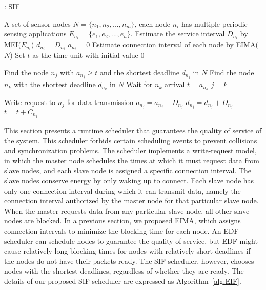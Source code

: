 \documentclass[10pt,journal,compsoc]{IEEEtran}
\newcommand{\algorithmicinput}{\textbf{Input:}}
\newcommand{\INPUT}{\item[\algorithmicinput]}
\begin{document}
\begin{algorithm}[h!]
  \caption{: SIF}
  \label{alg:EIF}
  \begin{algorithmic}[1]

  \INPUT
  A set of sensor nodes $N=\{n_1, n_2, ..., n_m\}$, each node $n_i$ has multiple periodic sensing applications $E_{n_i}=\{e_1, e_2,..., e_h\}$.
    \State Estimate the service interval $D_{n_i}$ by MEI($E_{n_i}$)
    \State $d_{n_i}=D_{n_i}$
    \State $a_{n_i}=0$
   \EndFor
   \State Estimate connection interval of each node by EIMA($N$)
   \State Set $t$ as the time unit with initial value $0$
  \EndIf

    \State Find the node $n_j$ with $a_{n_j} \geq t$ and the shortest deadline $d_{n_j}$ in $N$
    \State Find the node $n_k$ with the shortest deadline $d_{n_k}$  in $N$
        \State Wait for $n_k$ arrival
        \State $t=a_{n_k}$
        \State $j=k$
    \EndIf
   \EndIf

    \State Write request to $n_j$ for data transmission
    \State $a_{n_j}=a_{n_j}+D_{n_j}$
    \State $d_{n_j}=d_{n_j}+D_{n_j}$
    \State $t=t+C_{n_j}$
   \EndWhile
   \end{algorithmic}
\end{algorithm}

This section presents a runtime scheduler that guarantees the quality of service of the system. This scheduler forbids certain scheduling events to prevent collisions and synchronization problems. The scheduler implements a write-request model, in which the master node schedules the times at which it must request data from slave nodes, and each slave node is assigned a specific connection interval. The slave nodes conserve energy by only waking up to connect. Each slave node has only one connection interval during which it can transmit data, namely the connection interval authorized by the master node for that particular slave node. When the master requests data from any particular slave node, all other slave nodes are blocked. In a previous section, we proposed EIMA, which assigns connection intervals to minimize the blocking time for each node. An EDF scheduler can schedule nodes to guarantee the quality of service, but EDF might cause relatively long blocking times for nodes with relatively short deadlines if the nodes do not have their packets ready. The SIF scheduler, however, chooses nodes with the shortest deadlines, regardless of whether they are ready. The details of our proposed SIF scheduler are expressed as Algorithm~\ref{alg:EIF}.
\end{document}
